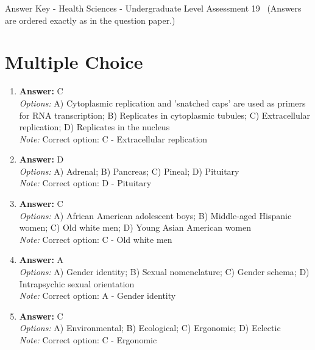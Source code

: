\documentclass[12pt]{article}
\begin{document}
\begin{center}
Answer Key - Health Sciences - Undergraduate Level Assessment 19 \
\small (Answers are ordered exactly as in the question paper.)
\end{center}

\section*{Multiple Choice}
\begin{enumerate}[label=\arabic*.]
\item \textbf{Answer:} C
\\ \textit{Options:} A) Cytoplasmic replication and 'snatched caps' are used as primers for RNA transcription; B) Replicates in cytoplasmic tubules; C) Extracellular replication; D) Replicates in the nucleus
\\ \textit{Note:} Correct option: C - Extracellular replication
\item \textbf{Answer:} D
\\ \textit{Options:} A) Adrenal; B) Pancreas; C) Pineal; D) Pituitary
\\ \textit{Note:} Correct option: D - Pituitary
\item \textbf{Answer:} C
\\ \textit{Options:} A) African American adolescent boys; B) Middle-aged Hispanic women; C) Old white men; D) Young Asian American women
\\ \textit{Note:} Correct option: C - Old white men
\item \textbf{Answer:} A
\\ \textit{Options:} A) Gender identity; B) Sexual nomenclature; C) Gender schema; D) Intrapsychic sexual orientation
\\ \textit{Note:} Correct option: A - Gender identity
\item \textbf{Answer:} C
\\ \textit{Options:} A) Environmental; B) Ecological; C) Ergonomic; D) Eclectic
\\ \textit{Note:} Correct option: C - Ergonomic
\end{enumerate}
\end{document}
